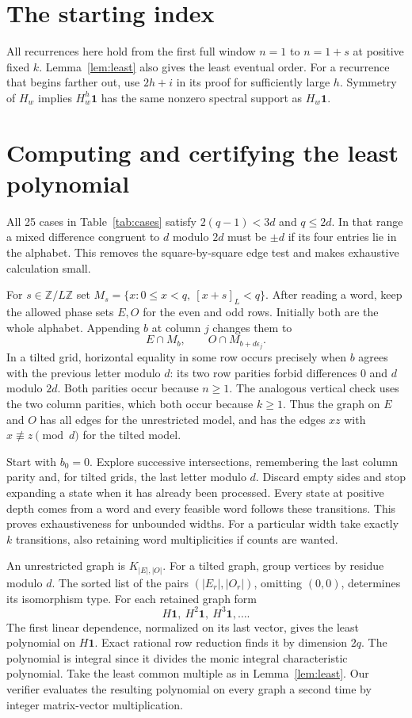 \documentclass[11pt,letterpaper]{article}
\newcommand{\one}{\mathbf 1}
\newcommand{\Z}{\mathbb Z}
\begin{document}
\section*{The starting index}
All recurrences here hold from the first full window $n=1$ to $n=1+s$ at positive fixed $k$. Lemma~\ref{lem:least} also gives the least eventual order. For a recurrence that begins farther out, use $2h+i$ in its proof for sufficiently large $h$. Symmetry of $H_w$ implies $H_w^h\one$ has the same nonzero spectral support as $H_w\one$.

\clearpage
\section{Computing and certifying the least polynomial}\label{sec:compute}

All 25 cases in Table~\ref{tab:cases} satisfy $2(q-1)<3d$ and $q\le2d$. In that range a mixed difference congruent to $d$ modulo $2d$ must be $\pm d$ if its four entries lie in the alphabet. This removes the square-by-square edge test and makes exhaustive calculation small.

For $s\in\Z/L\Z$ set $M_s=\{x:0\le x<q,\ [x+s]_L<q\}$. After reading a word, keep the allowed phase sets $E,O$ for the even and odd rows. Initially both are the whole alphabet. Appending $b$ at column $j$ changes them to
\[
 E\cap M_b,\qquad O\cap M_{b+d\epsilon_j}.
\]
In a tilted grid, horizontal equality in some row occurs precisely when $b$ agrees with the previous letter modulo $d$: its two row parities forbid differences $0$ and $d$ modulo $2d$. Both parities occur because $n\ge1$. The analogous vertical check uses the two column parities, which both occur because $k\ge1$. Thus the graph on $E$ and $O$ has all edges for the unrestricted model, and has the edges $xz$ with $x\not\equiv z\pmod d$ for the tilted model.

Start with $b_0=0$. Explore successive intersections, remembering the last column parity and, for tilted grids, the last letter modulo $d$. Discard empty sides and stop expanding a state when it has already been processed. Every state at positive depth comes from a word and every feasible word follows these transitions. This proves exhaustiveness for unbounded widths. For a particular width take exactly $k$ transitions, also retaining word multiplicities if counts are wanted.

An unrestricted graph is $K_{|E|,|O|}$. For a tilted graph, group vertices by residue modulo $d$. The sorted list of the pairs $(|E_r|,|O_r|)$, omitting $(0,0)$, determines its isomorphism type. For each retained graph form
\[
 H\one,\ H^2\one,\ H^3\one,\ldots .
\]
The first linear dependence, normalized on its last vector, gives the least polynomial on $H\one$. Exact rational row reduction finds it by dimension $2q$. The polynomial is integral since it divides the monic integral characteristic polynomial. Take the least common multiple as in Lemma~\ref{lem:least}. Our verifier evaluates the resulting polynomial on every graph a second time by integer matrix-vector multiplication.
\end{document}

